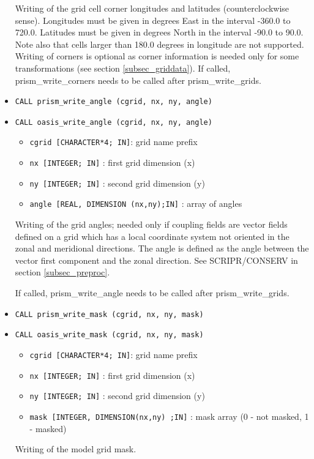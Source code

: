 \begin{itemize}
 Writing of the grid cell corner longitudes and latitudes
 (counterclockwise sense). Longitudes must be given in degrees East in
 the interval -360.0 to 720.0. Latitudes must be given in degrees
 North in the interval -90.0 to 90.0. Note also that cells larger than
 180.0 degrees in longitude are not supported. Writing of corners is
 optional as corner information is needed only for some
 transformations (see section \ref{subsec_griddata}). If called,
 prism\_write\_corners needs to be called after prism\_write\_grids.

\item {\tt CALL prism\_write\_angle (cgrid, nx, ny, angle)}
\item {\tt CALL oasis\_write\_angle (cgrid, nx, ny, angle)}

 \begin{itemize}
    \item {\tt cgrid [CHARACTER*4; IN]}: grid name prefix
    \item {\tt nx [INTEGER; IN]} : first grid dimension (x)
    \item {\tt ny [INTEGER; IN]} : second grid dimension (y)
    \item {\tt angle [REAL, DIMENSION (nx,ny);IN]} : array of angles
 \end{itemize}

 Writing of the grid angles; needed only if coupling fields
 are vector fields defined on a grid which has a local coordinate system not oriented in 
 the zonal and meridional directions. The angle is defined as the angle between the vector
 first component and the zonal direction. See SCRIPR/CONSERV in section \ref{subsec_preproc}.

 If called,
 prism\_write\_angle needs to be called after prism\_write\_grids.

\item {\tt CALL prism\_write\_mask (cgrid, nx, ny, mask)}
\item {\tt CALL oasis\_write\_mask (cgrid, nx, ny, mask)}

 \begin{itemize}
    \item {\tt cgrid [CHARACTER*4; IN]}: grid name prefix 
    \item {\tt nx [INTEGER; IN]} : first grid dimension (x)
    \item {\tt ny [INTEGER; IN]} : second grid dimension (y)
    \item {\tt mask [INTEGER, DIMENSION(nx,ny) ;IN]} : mask array (0 - not masked, 1 - masked)
 \end{itemize}
Writing of the model grid mask.


\end{itemize}

